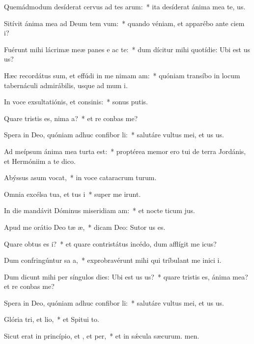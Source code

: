 \item Quemádmodum desíderat cervus ad tes arum:~* ita desíderat ánima mea  te, us.
\item Sitívit ánima mea ad Deum tem vum:~* quando véniam, et apparébo ante ciem i?
\item Fuérunt mihi lácrimæ meæ panes e ac te:~* dum dícitur mihi quotídie: Ubi est us us?
\item Hæc recordátus sum, et effúdi in me nimam am:~* quóniam transíbo in locum tabernáculi admirábilis, usque ad mum i.
\item In voce exsultatiónis, et consinis:~* sonus putis.
\item Quare tristis es, nima a?~* et re conbas me?
\item Spera in Deo, quóniam adhuc confibor li:~* salutáre vultus mei, et us us.
\item Ad meípsum ánima mea turta est:~* proptérea memor ero tui de terra Jordánis, et Hermóniim a te dico.
\item Abýssus asum vocat,~* in voce cataracrum turum.
\item Omnia excélsa tua, et tus i~* super me irunt.
\item In die mandávit Dóminus miseridiam am:~* et nocte ticum jus.
\item Apud me orátio Deo tæ æ,~* dicam Deo: Sutor us es.
\item Quare obtus es i?~* et quare contristátus incédo, dum afflígit me icus?
\item Dum confringúntur sa a,~* exprobravérunt mihi qui tríbulant me inici i.
\item Dum dicunt mihi per síngulos dies: Ubi est us us?~* quare tristis es, ánima mea? et re conbas me?
\item Spera in Deo, quóniam adhuc confibor li:~* salutáre vultus mei, et us us.
\item Glória tri, et lio,~* et Spitui to.
\item Sicut erat in princípio, et , et per,~* et in sǽcula sæcurum. men.

